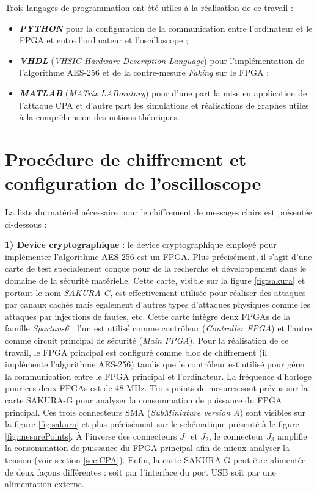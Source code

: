 \documentclass[oneside]{book}
\begin{document}
\hspace{-0.5cm}Trois langages de programmation ont été utiles à la réalisation de ce travail : 
\begin{itemize}
\item \textbf{\textit{PYTHON}} pour la configuration de la communication entre l'ordinateur et le FPGA et entre l'ordinateur et l'oscilloscope ;
\item \textbf{\textit{VHDL}} (\textit{VHSIC Hardware Description Language}) pour l'implémentation de l'algorithme AES-256 et de la contre-mesure \textit{Faking} sur le FPGA ;
\item \textbf{\textit{MATLAB}} (\textit{MATrix LABoratory}) pour d'une part la mise en application de l'attaque CPA et d'autre part les simulations et réalisations de graphes utiles à la compréhension des notions théoriques. \\
\end{itemize}


\section{Procédure de chiffrement et configuration de l'oscilloscope}
\label{sec:config_chiff}

\hspace{-0.5cm}La liste du matériel nécessaire pour le chiffrement de messages clairs est présentée ci-dessous : 

\hspace{-0.5cm}\textbf{1) Device cryptographique} : le device cryptographique employé pour implémenter l'algorithme AES-256 est un FPGA. Plus précisément, il s'agit d'une carte de test spécialement conçue pour de la recherche et développement dans le domaine de la sécurité matérielle. Cette carte, visible sur la figure \ref{fig:sakura} et portant le nom \textit{SAKURA-G}, est effectivement utilisée pour réaliser des attaques par canaux cachés mais également d'autres types d'attaques physiques comme les attaques par injections de fautes, etc. Cette carte intègre deux FPGAs de la famille \textit{Spartan-6} : l'un est utilisé comme contrôleur (\textit{Controller FPGA}) et l'autre comme circuit principal de sécurité (\textit{Main FPGA}). Pour la réalisation de ce travail, le FPGA principal est configuré comme bloc de chiffrement (il implémente l'algorithme AES-256) tandis que le contrôleur est utilisé pour gérer la communication entre le FPGA principal et l'ordinateur. La fréquence d'horloge pour ces deux FPGAs est de 48 MHz. Trois points de mesures sont prévus sur la carte SAKURA-G pour analyser la consommation de puissance du FPGA principal. Ces trois connecteurs SMA (\textit{SubMiniature version A}) sont visibles sur la figure \ref{fig:sakura} et plus précisément sur le schématique présenté à le figure \ref{fig:mesurePoints}. À l'inverse des connecteurs $J_1$ et $J_2$, le connecteur $J_3$ amplifie la consommation de puissance du FPGA principal afin de mieux analyser la tension (voir section \ref{sec:CPA}). Enfin, la carte SAKURA-G peut être alimentée de deux façons différentes : soit par l'interface du port USB soit par une alimentation externe.
\end{document}

